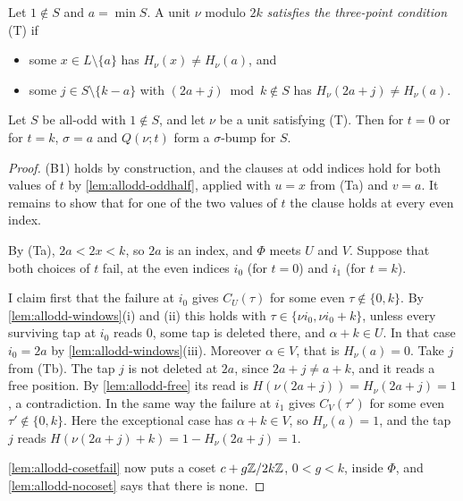 \begin{definition}
\label{def:allodd-e3}
Let $1\notin S$ and $a=\min S$. A unit $\nu$ modulo $2k$ \emph{satisfies the three-point
condition} (T) if
\begin{itemize}
\item[(Ta)] some $x\in L\setminus\{a\}$ has $H_\nu(x)\ne H_\nu(a)$,
and
\item[(Tb)] some $j\in S\setminus\{k-a\}$ with $(2a+j)\bmod k\notin S$ has
$H_\nu(2a+j)\ne H_\nu(a)$.
\end{itemize}
\end{definition}

\begin{proposition}
\label{prop:allodd-e3bump}
Let $S$ be all-odd with $1\notin S$, and let $\nu$ be a unit satisfying (T).
Then for $t=0$ or for $t=k$, $\sigma=a$ and $Q(\nu;t)$ form a $\sigma$-bump
for $S$.
\end{proposition}

\begin{proof}
(B1) holds by construction, and the clauses at odd indices hold for both
values of $t$ by \autoref{lem:allodd-oddhalf}, applied with $u=x$ from (Ta)
and $v=a$. It remains to show that for one of the two values of $t$ the
clause holds at every even index.

By (Ta), $2a<2x<k$, so $2a$ is an index, and $\Phi$ meets $U$ and $V$. Suppose
that both choices of $t$ fail, at the even indices $i_0$ (for $t=0$) and $i_1$
(for $t=k$).

I claim first that the failure at $i_0$ gives $C_U(\tau)$ for some even
$\tau\notin\{0,k\}$. By \autoref{lem:allodd-windows}(i) and (ii) this holds
with $\tau\in\{\nu i_0,\nu i_0+k\}$, unless every surviving tap at $i_0$ reads $0$,
some tap is deleted there, and $\alpha+k\in U$. In that case $i_0=2a$ by
\autoref{lem:allodd-windows}(iii). Moreover $\alpha\in V$, that is
$H_\nu(a)=0$. Take $j$ from (Tb). The tap $j$ is not deleted at $2a$,
since $2a+j\ne a+k$, and it reads a free position. By \autoref{lem:allodd-free}
its read is $H(\nu(2a+j))=H_\nu(2a+j)=1$, a contradiction. In the same
way the failure at $i_1$ gives $C_V(\tau')$ for some even
$\tau'\notin\{0,k\}$. Here the exceptional case has $\alpha+k\in V$, so
$H_\nu(a)=1$, and the tap $j$ reads $H(\nu(2a+j)+k)=
1-H_\nu(2a+j)=1$.

\autoref{lem:allodd-cosetfail} now puts a coset $c+g\mathbb{Z}/2k\mathbb{Z}$, $0<g<k$, inside
$\Phi$, and \autoref{lem:allodd-nocoset} says that there is none.
\end{proof}

